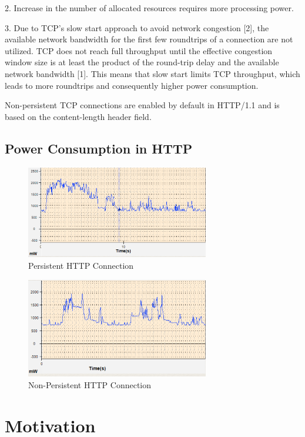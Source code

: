 \documentclass[9pt]{sigplan-proc-varsize}
\begin{document}
2. Increase in the number of allocated resources requires more processing power.

3. Due to TCP’s slow start approach to avoid network congestion [2], the available network bandwidth for the first few roundtrips of a connection are not utilized. TCP does not reach full throughput until the effective congestion window size is at least the product of the round-trip delay and the available network bandwidth [1]. This means that slow start limits TCP throughput, which leads to more roundtrips and consequently higher power consumption.

Non-persistent TCP connections are enabled by default in HTTP/1.1 and is based on the content-length header field.

\bigskip

\subsection{Power Consumption in HTTP}

\begin{figure}[ht!]
\centering
\includegraphics[width=80mm]{powerconsumption1.png}
\caption{Persistent HTTP Connection }
\label{fig:sp_gd_mnist}
\end{figure}

\begin{figure}[ht!]
\centering
\includegraphics[width=80mm]{powerconsumption2.png}
\caption{Non-Persistent HTTP Connection }
\label{fig:sp_gd_mnist}
\end{figure}

\bigskip

\section{Motivation}
\end{document}
